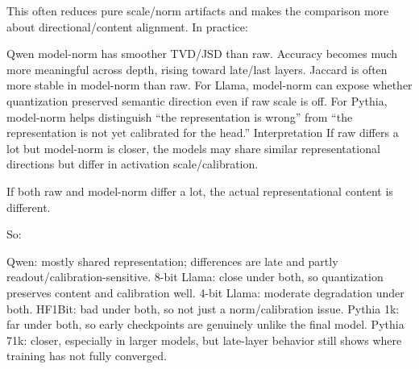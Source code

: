 This often reduces pure scale/norm artifacts and makes the comparison more about directional/content alignment. In practice:

Qwen model-norm has smoother TVD/JSD than raw.
Accuracy becomes much more meaningful across depth, rising toward late/last layers.
Jaccard is often more stable in model-norm than raw.
For Llama, model-norm can expose whether quantization preserved semantic direction even if raw scale is off.
For Pythia, model-norm helps distinguish “the representation is wrong” from “the representation is not yet calibrated for the head.”
Interpretation
If raw differs a lot but model-norm is closer, the models may share similar representational directions but differ in activation scale/calibration.

If both raw and model-norm differ a lot, the actual representational content is different.

So:

Qwen: mostly shared representation; differences are late and partly readout/calibration-sensitive.
8-bit Llama: close under both, so quantization preserves content and calibration well.
4-bit Llama: moderate degradation under both.
HF1Bit: bad under both, so not just a norm/calibration issue.
Pythia 1k: far under both, so early checkpoints are genuinely unlike the final model.
Pythia 71k: closer, especially in larger models, but late-layer behavior still shows where training has not fully converged.